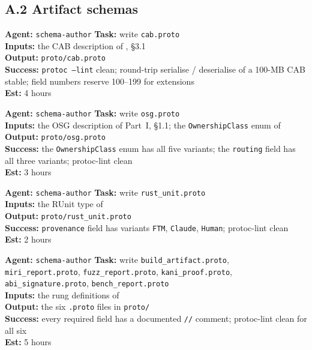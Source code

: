 \documentclass[12pt]{article}
\theoremstyle{definition}
\theoremstyle{remark}
\newenvironment{tasklist}{%
  \begingroup\raggedright
  \begin{description}[style=nextline, leftmargin=1.4cm, itemsep=0.4em]
}{%
  \end{description}
  \endgroup
}
\begin{document}
\subsection*{A.2 Artifact schemas}

\begin{tasklist}
\item[\textbf{Task A.2.1}] \textbf{Agent:} \texttt{schema-author} \quad
  \textbf{Task:} write \texttt{cab.proto}\\
  \textbf{Inputs:} the CAB description of \cite{ferrousdevplan2026},
  \S{}3.1\\
  \textbf{Output:} \texttt{proto/cab.proto}\\
  \textbf{Success:} \texttt{protoc --lint} clean; round-trip serialise
  / deserialise of a 100-MB CAB stable; field numbers reserve
  100--199 for extensions\\
  \textbf{Est:} 4 hours

\item[\textbf{Task A.2.2}] \textbf{Agent:} \texttt{schema-author} \quad
  \textbf{Task:} write \texttt{osg.proto}\\
  \textbf{Inputs:} the OSG description of Part~I, \S{}1.1; the
  \texttt{OwnershipClass} enum of \cite{ferrousdevplan2026}\\
  \textbf{Output:} \texttt{proto/osg.proto}\\
  \textbf{Success:} the \texttt{OwnershipClass} enum has all five
  variants; the \texttt{routing} field has all three variants;
  protoc-lint clean\\
  \textbf{Est:} 3 hours

\item[\textbf{Task A.2.3}] \textbf{Agent:} \texttt{schema-author} \quad
  \textbf{Task:} write \texttt{rust\_unit.proto}\\
  \textbf{Inputs:} the RUnit type of
  \\
  \textbf{Output:} \texttt{proto/rust\_unit.proto}\\
  \textbf{Success:} \texttt{provenance} field has variants
  \texttt{FTM}, \texttt{Claude}, \texttt{Human}; protoc-lint clean\\
  \textbf{Est:} 2 hours

\item[\textbf{Task A.2.4}] \textbf{Agent:} \texttt{schema-author} \quad
  \textbf{Task:} write \texttt{build\_artifact.proto},
  \texttt{miri\_report.proto}, \texttt{fuzz\_report.proto},
  \texttt{kani\_proof.proto}, \texttt{abi\_signature.proto},
  \texttt{bench\_report.proto}\\
  \textbf{Inputs:} the rung definitions of
  \\
  \textbf{Output:} the six \texttt{.proto} files in \texttt{proto/}\\
  \textbf{Success:} every required field has a documented
  \texttt{//} comment; protoc-lint clean for all six\\
  \textbf{Est:} 5 hours


\end{tasklist}
\end{document}
